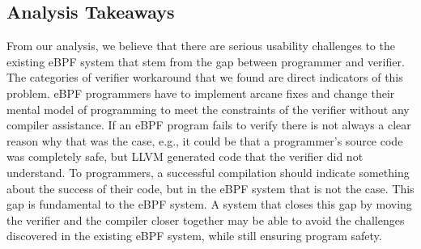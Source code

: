 \subsection{Analysis Takeaways}
From our analysis, we believe that there are serious usability challenges to the
    existing eBPF system that stem from the gap between programmer and verifier.
The categories of verifier workaround that we found are direct indicators of this problem.
eBPF programmers have to implement arcane fixes and change their mental model of
    programming to meet the constraints of the verifier without any compiler assistance.
If an eBPF program fails to verify there is not always a clear reason why that was the case, e.g.,
it could be that a programmer's source code was completely safe, but LLVM generated code that the verifier did not understand.
To programmers, a successful compilation should indicate something about the success of their code, but in the eBPF system that is not the case.
This gap is fundamental to the eBPF system.
A system that closes this gap by moving the verifier and the compiler closer together may be able to avoid the challenges discovered in the existing eBPF system, while still ensuring program safety.



